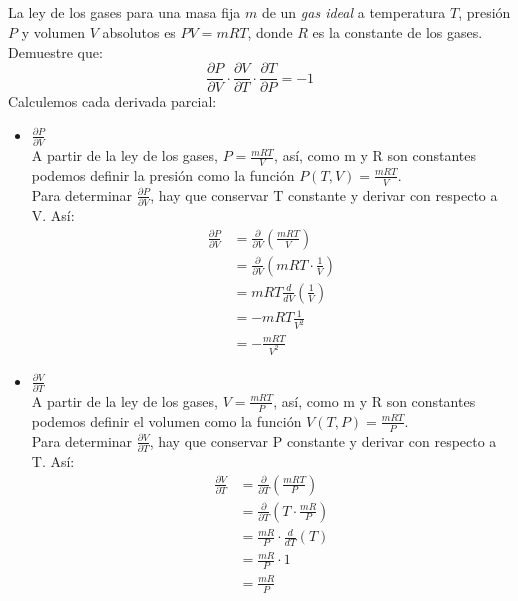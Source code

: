\documentclass[12pt]{article}
\begin{document}
\begin{itemize}[format=\textbf]
\section{}

La ley de los gases para una masa fija $m$ de un \textit{gas ideal} a temperatura $T$, presión $P$ y volumen $V$ absolutos es $P V = mRT$, donde $R$ es la constante de los gases. Demuestre que:
 $$\frac{\partial P}{\partial V} \cdot \frac{\partial V}{\partial T} \cdot \frac{\partial T}{\partial P} = -1$$ 
Calculemos cada derivada parcial:
\begin{itemize}
\item $\frac{\partial P}{\partial V}$\\
  A partir de la ley de los gases,  $P =\frac{mRT}{V}$, así, como m y R son constantes podemos definir la presión como la función $P(T,V) = \frac{mRT}{V} $.\\ Para determinar  $\frac{\partial P}{\partial V}$,  hay que conservar T constante y derivar con respecto a V. Así:
    \begin{align*}
      \frac{\partial P}{\partial V} &= \frac{\partial}{\partial V}\left(\frac{mRT}{V}\right) \\
      &= \frac{\partial}{\partial V}\left(mRT \cdot \frac{1}{V} \right) \\
      &= mRT \frac{d}{d V}\left(\frac{1}{V} \right) \\
      &=  -mRT\frac{1}{V^2} \\
      &= -\frac{mRT}{V^2}
  \end{align*}

 \item $\frac{\partial V}{\partial T}$\\
  A partir de la ley de los gases,  $V =\frac{mRT}{P}$, así, como m y R son constantes podemos definir el volumen como la función $V(T,P) =\frac{mRT}{P}$.\\ Para determinar  $\frac{\partial V}{\partial T}$,  hay que conservar P constante y derivar con respecto a T. Así:
    \begin{align*}
     \frac{\partial V}{\partial T} &= \frac{\partial}{\partial T}\left(\frac{mRT}{P}\right) \\
      &= \frac{\partial}{\partial T}\left(T \cdot \frac{mR}{P} \right) \\
      &= \frac{mR}{P} \cdot  \frac{d}{d T}\left(T \right) \\
      &=  \frac{mR}{P} \cdot 1\\
      &=   \frac{mR}{P} 
    \end{align*}


\end{itemize}
\end{itemize}
\end{document}
